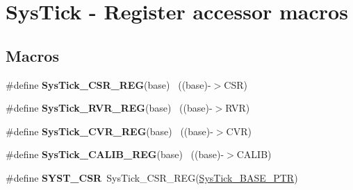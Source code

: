 \hypertarget{group___sys_tick___register___accessor___macros}{}\section{Sys\+Tick -\/ Register accessor macros}
\label{group___sys_tick___register___accessor___macros}
\subsection*{Macros}
\begin{DoxyCompactItemize}
\item 
\hypertarget{group___sys_tick___register___accessor___macros_ga07f2beb63f7b50b9e1fa8b383d9ca87c}{}\#define {\bfseries Sys\+Tick\+\_\+\+C\+S\+R\+\_\+\+R\+E\+G}(base)                                    ~((base)-\/$>$C\+S\+R)\label{group___sys_tick___register___accessor___macros_ga07f2beb63f7b50b9e1fa8b383d9ca87c}

\item 
\hypertarget{group___sys_tick___register___accessor___macros_gae6985161bde8ca82ac983a2d43839595}{}\#define {\bfseries Sys\+Tick\+\_\+\+R\+V\+R\+\_\+\+R\+E\+G}(base)                                    ~((base)-\/$>$R\+V\+R)\label{group___sys_tick___register___accessor___macros_gae6985161bde8ca82ac983a2d43839595}

\item 
\hypertarget{group___sys_tick___register___accessor___macros_ga12164c6b1ad1c5e5d5cac7129940d0bf}{}\#define {\bfseries Sys\+Tick\+\_\+\+C\+V\+R\+\_\+\+R\+E\+G}(base)                                    ~((base)-\/$>$C\+V\+R)\label{group___sys_tick___register___accessor___macros_ga12164c6b1ad1c5e5d5cac7129940d0bf}

\item 
\hypertarget{group___sys_tick___register___accessor___macros_gab41be68de8d2d31d938d419f9feb900f}{}\#define {\bfseries Sys\+Tick\+\_\+\+C\+A\+L\+I\+B\+\_\+\+R\+E\+G}(base)                                ~((base)-\/$>$C\+A\+L\+I\+B)\label{group___sys_tick___register___accessor___macros_gab41be68de8d2d31d938d419f9feb900f}

\item 
\hypertarget{group___sys_tick___register___accessor___macros_gab26b3fc75982181f81b185b206e897f6}{}\#define {\bfseries S\+Y\+S\+T\+\_\+\+C\+S\+R}~Sys\+Tick\+\_\+\+C\+S\+R\+\_\+\+R\+E\+G(\hyperlink{group___sys_tick___peripheral_gaeef73642fdef722ce658e468dad877ea}{Sys\+Tick\+\_\+\+B\+A\+S\+E\+\_\+\+P\+T\+R})\label{group___sys_tick___register___accessor___macros_gab26b3fc75982181f81b185b206e897f6}


\end{DoxyCompactItemize}
